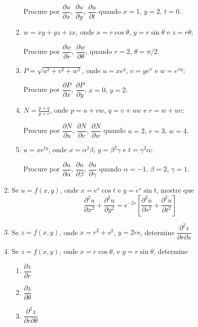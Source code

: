 \documentclass[11pt,a4paper]{article}
\begin{document}
\begin{enumerate}
\begin{enumerate}
		Procure por $\dfrac{\partial u}{\partial x}$, $\dfrac{\partial u}{\partial y}$, $\dfrac{\partial u}{\partial t}$ quando $x = 1$, $y = 2$, $t = 0$.
		\item $w = xy + yz + zx$, onde $x = r \cos \theta $, $y = r \sin \theta$ e $z = r \theta $; 
		
		Procure por $\dfrac{\partial w}{\partial r}$, $\dfrac{\partial w}{\partial \theta}$, quando $r = 2$, $\theta = \pi / 2$.
		\item $P = \sqrt{u^2 + v^2 + w^2}$, onde $u = xe^y$, $v = ye^x$ e $w = e^{xy}$; 
		
		Procure por $\dfrac{\partial P}{\partial x}$, $\dfrac{\partial P}{\partial y}$, $x = 0$, $y = 2$.
		\item $N = \displaystyle\frac{p + q}{p + r}$, onde $p = u + vw$, $q = v + uw$ e $r = w + uv$;
		
		 Procure por $\dfrac{\partial N}{\partial u}$, $\dfrac{\partial N}{\partial v}$, $\dfrac{\partial N}{\partial w}$ quando $u = 2$, $v = 3$, $w = 4$.
		
		\item $u = xe^{ty}$, onde $x = \alpha^2 \beta$, $y = \beta^2\gamma$ e $t = \gamma^2 \alpha$;
		
		 Procure por $\dfrac{\partial u}{\partial \alpha}$, $\dfrac{\partial u}{\partial \beta}$, $\dfrac{\partial u}{\partial \gamma}$ quando $\alpha = -1$, $\beta = 2$, $\gamma = 1$.
	\end{enumerate}
	
	\item Se $u = f(x,y)$, onde $x = e^s\cos t$ e $y = e^s \sin t$, mostre que
	$$\dfrac{\partial^2 u}{\partial x^2} + \dfrac{\partial^2 u}{\partial y^2} = e^{-2s}\left[\dfrac{\partial^2 u}{\partial s^2} + \dfrac{\partial^2 u}{\partial t^2}\right]$$
	
	 \item Se $z = f(x,y)$, onde $x = r^2 + s^2$, $y = 2rs$, determine $\dfrac{\partial^2 z}{\partial r \partial s}$
	 
	 \item Se $z = f(x,y)$, onde $x = r \cos \theta$, e $y = r \sin \theta$, determine
	 \begin{enumerate}
	 	\item $\dfrac{\partial z}{\partial r}$
	 	\item $\dfrac{\partial z}{\partial \theta}$
	 	\item $\dfrac{\partial^2 z}{\partial r \partial \theta}$
	 \end{enumerate}
	 

\end{enumerate}
\end{document}
